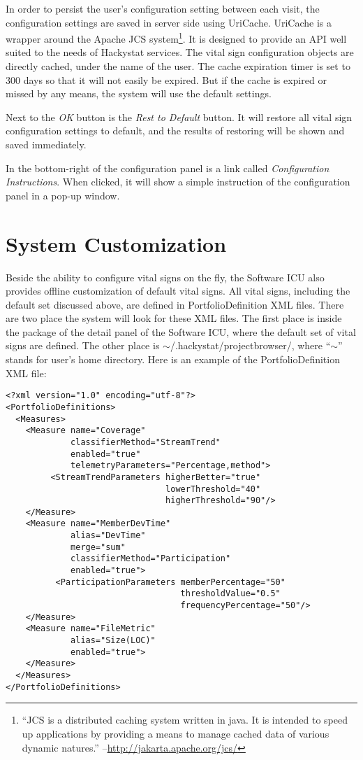 In order to persist the user's configuration setting between each visit, the configuration settings are saved in server side using UriCache. UriCache is a wrapper around the Apache JCS system\footnote{``JCS is a distributed caching system written in java. It is intended to speed up applications by providing a means to manage cached data of various dynamic natures.'' --\url{http://jakarta.apache.org/jcs/}}. It is designed to provide an API well suited to the needs of Hackystat services. The vital sign configuration objects are directly cached, under the name of the user. The cache expiration timer is set to 300 days so that it will not easily be expired. But if the cache is expired or missed by any means, the system will use the default settings.

Next to the {\it OK} button is the {\it Rest to Default} button. It will restore all vital sign configuration settings to default, and the results of restoring will be shown and saved immediately. 

In the bottom-right of the configuration panel is a link called {\it Configuration Instructions}. When clicked, it will show a simple instruction of the configuration panel in a pop-up window.


\section{System Customization}
\label{SystemCustomization}

Beside the ability to configure vital signs on the fly, the Software ICU also provides offline customization of default vital signs. All vital signs, including the default set discussed above, are defined in PortfolioDefinition XML files. There are two place the system will look for these XML files. The first place is inside the package of the detail panel of the Software ICU, where the default set of vital signs are defined. The other place is \(\sim\)/.hackystat/projectbrowser/, where ``\(\sim\)'' stands for user's home directory. Here is an example of the PortfolioDefinition XML file:

\begin{verbatim}
<?xml version="1.0" encoding="utf-8"?>
<PortfolioDefinitions>
  <Measures>
    <Measure name="Coverage" 
             classifierMethod="StreamTrend" 
             enabled="true"
             telemetryParameters="Percentage,method">
         <StreamTrendParameters higherBetter="true" 
                                lowerThreshold="40" 
                                higherThreshold="90"/>
    </Measure>
    <Measure name="MemberDevTime" 
             alias="DevTime" 
             merge="sum" 
             classifierMethod="Participation" 
             enabled="true">
          <ParticipationParameters memberPercentage="50" 
                                   thresholdValue="0.5" 
                                   frequencyPercentage="50"/>
    </Measure>
    <Measure name="FileMetric" 
             alias="Size(LOC)" 
             enabled="true">
    </Measure>
  </Measures>
</PortfolioDefinitions>
\end{verbatim}

